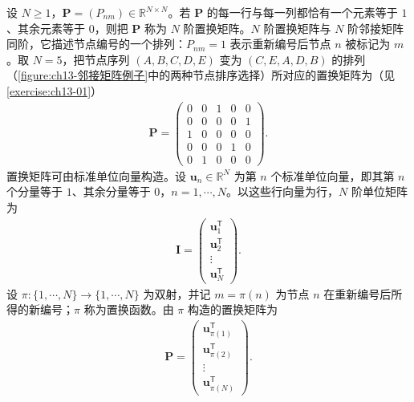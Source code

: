 \documentclass[../../main.tex]{subfiles}
\begin{document}
\begin{definition}[置换矩阵]\label{definition:ch13-置换矩阵}
设 $N\geqslant1$，$\bm{P}=(P_{nm})\in\mathbb{R}^{N\times N}$。若 $\bm{P}$ 的每一行与每一列都恰有一个元素等于 $1$、其余元素等于 $0$，则把 $\bm{P}$ 称为 $N$ 阶置换矩阵。$N$ 阶置换矩阵与 $N$ 阶邻接矩阵同阶，它描述节点编号的一个排列：$P_{nm}=1$ 表示重新编号后节点 $n$ 被标记为 $m$。取 $N=5$，把节点序列 $(A,B,C,D,E)$ 变为 $(C,E,A,D,B)$ 的排列（\cref{figure:ch13-邻接矩阵例子}中的两种节点排序选择）所对应的置换矩阵为（见\cref{exercise:ch13-01}）
\begin{align}
\bm{P}=\begin{pmatrix}0&0&1&0&0\\0&0&0&0&1\\1&0&0&0&0\\0&0&0&1&0\\0&1&0&0&0\end{pmatrix}.
\label{align:ch13-置换矩阵例子}
\end{align}
置换矩阵可由标准单位向量构造。设 $\bm{u}_n\in\mathbb{R}^{N}$ 为第 $n$ 个标准单位向量，即其第 $n$ 个分量等于 $1$、其余分量等于 $0$，$n=1,\cdots,N$。以这些行向量为行，$N$ 阶单位矩阵为
\begin{align}
\bm{I}=\begin{pmatrix}\bm{u}_1^{\mathsf T}\\\bm{u}_2^{\mathsf T}\\\vdots\\\bm{u}_N^{\mathsf T}\end{pmatrix}.
\label{align:ch13-单位矩阵}
\end{align}
设 $\pi:\{1,\cdots,N\}\to\{1,\cdots,N\}$ 为双射，并记 $m=\pi(n)$ 为节点 $n$ 在重新编号后所得的新编号；$\pi$ 称为置换函数。由 $\pi$ 构造的置换矩阵为
\begin{align}
\bm{P}=\begin{pmatrix}\bm{u}_{\pi(1)}^{\mathsf T}\\\bm{u}_{\pi(2)}^{\mathsf T}\\\vdots\\\bm{u}_{\pi(N)}^{\mathsf T}\end{pmatrix}.
\label{align:ch13-置换矩阵一般形式}
\end{align}
\end{definition}
\end{document}
